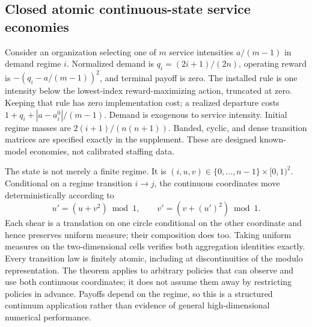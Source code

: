 \subsection{Closed atomic continuous-state service economies}\label{sec:structuredexperiment}
Consider an organization selecting one of $m$ service intensities $a/(m-1)$ in demand regime $i$. Normalized demand is $q_i=(2i+1)/(2n)$, operating reward is $-(q_i-a/(m-1))^2$, and terminal payoff is zero. The installed rule is one intensity below the lowest-index reward-maximizing action, truncated at zero. Keeping that rule has zero implementation cost; a realized departure costs $1+q_i+|a-a_i^0|/(m-1)$. Demand is exogenous to service intensity. Initial regime masses are $2(i+1)/(n(n+1))$. Banded, cyclic, and dense transition matrices are specified exactly in the supplement. These are designed known-model economies, not calibrated staffing data.

The state is not merely a finite regime. It is $(i,u,v)\in\{0,\ldots,n-1\}\times[0,1)^2$. Conditional on a regime transition $i\to j$, the continuous coordinates move deterministically according to
\begin{equation}\label{eq:shear}
 u'=(u+v^2)\bmod1,\qquad v'=(v+(u')^2)\bmod1.
\end{equation}
Each shear is a translation on one circle conditional on the other coordinate and hence preserves uniform measure; their composition does too. Taking uniform measures on the two-dimensional cells verifies both aggregation identities exactly. Every transition law is finitely atomic, including at discontinuities of the modulo representation. The theorem applies to arbitrary policies that can observe and use both continuous coordinates; it does not assume them away by restricting policies in advance. Payoffs depend on the regime, so this is a structured continuum application rather than evidence of general high-dimensional numerical performance.

